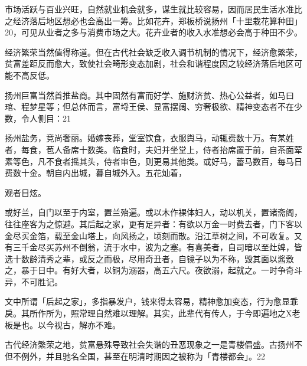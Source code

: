 市场活跃与百业兴旺，自然就业机会就多，谋生就比较容易，因而居民生活水准比之经济落后地区想必也会高出一筹。比如花卉，郑板桥说扬州「十里栽花算种田」20，可见从业者之多与消费市场之大。花卉业者的收入水准想必会高于种田不少。

\vfill
\begin{BookNotes}
\end{BookNotes}

经济繁荣当然值得称道。但在古代社会缺乏收入调节机制的情况下，经济愈繁荣，贫富差距反而愈大，致使社会畸形变态加剧，社会和谐程度因之较经济落后地区可能不高反低。

扬州巨富当然首推盐商。其中固然有富而好学、施财济贫、热心公益者，如马曰琯、程梦星等；但总体而言，富埒王侯、显富摆阔、穷奢极欲、精神变态者不在少数，令人侧目：21

\begin{BookQuote}
扬州盐务，竞尚奢丽。婚嫁丧葬，堂室饮食，衣服舆马，动辄费数十万。有某姓者，每食，苞人备席十数类。临食时，夫妇并坐堂上，侍者抬席置于前，自茶面荤素等色，凡不食者摇其头，侍者审色，则更易其他类。或好马，蓄马数百，每马日费数十金。朝自内出城，暮自城外入。五花灿着，
\end{BookQuote}

观者目炫。

\begin{BookQuote}
或好兰，自门以至于内室，置兰殆遍。或以木作裸体妇人，动以机关，置诸斋阁，往往座客为之惊避。其后起之家，更有足异者：有欲以万金一时费去者，门下客以金尽买金箔，载至金山塔上，向风扬之，顷刻而散。沿江草树之间，不可收复。又有三千金尽买苏州不倒翁，流于水中，波为之塞。有喜美者，自司暗以至灶婢，皆选十数龄清秀之辈，或反之而极，尽用奇丑者，自镜子以为不称，毁其面以酱敷之，暴于日中。有好大者，以铜为溺器，高五六尺。夜欲溺，起就之。一时争奇斗异，不可胜记。
\end{BookQuote}

文中所谓「后起之家」，多指暴发户，钱来得太容易，精神愈加变态，行为愈显乖戾。其所作所为，照常理自然难以理解。其实，此辈代有传人，于今即遍地之X老板是也。以今视古，解亦不难。

古代经济繁荣之地，贫富悬殊导致社会失谐的丑恶现象之一是青楼倡盛。古扬州不但不例外，并且驰名全国，甚至在明清时期因之被称为「青楼都会」。22

\vfill
\begin{BookNotes}
\end{BookNotes}

